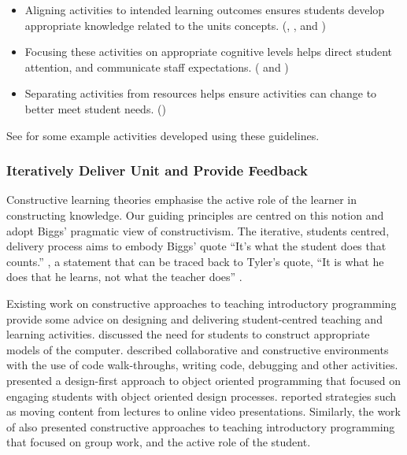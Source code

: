 \begin{itemize}[noitemsep,nolistsep]
	\item Aligning activities to intended learning outcomes ensures students develop appropriate knowledge related to the units concepts. (, , and )
	\item Focusing these activities on appropriate cognitive levels helps direct student attention, and communicate staff expectations. ( and )
	\item Separating activities from resources helps ensure activities can change to better meet student needs. ()
\end{itemize}

See  for some example activities developed using these guidelines.



\subsubsection{Iteratively Deliver Unit and Provide Feedback} %
\label{ssub:deliver_unit}

Constructive learning theories emphasise the active role of the learner in constructing knowledge. Our guiding principles are centred on this notion and adopt Biggs' pragmatic view of constructivism. The iterative, students centred, delivery process aims to embody Biggs' quote ``It's what the student does that counts.'' \cite{Biggs:1996c}, a statement that can be traced back to Tyler's quote, ``It is what he does that he learns, not what the teacher does'' \cite{Tyler:1969}.

Existing work on constructive approaches to teaching introductory programming provide some advice on designing and delivering student-centred teaching and learning activities. \citet{BenAri:1998,BenAri:2001} discussed the need for students to construct appropriate models of the computer. \citet{VanGorp:2001} described collaborative and constructive environments with the use of code walk-throughs, writing code, debugging and other activities. \citet{Thramboulidis:2003} presented a design-first approach to object oriented programming that focused on engaging students with object oriented design processes. \citet{Wulf:2005} reported strategies such as moving content from lectures to online video presentations. Similarly, the work of \citet{Thota:2010} also presented constructive approaches to teaching introductory programming that focused on group work, and the active role of the student.

